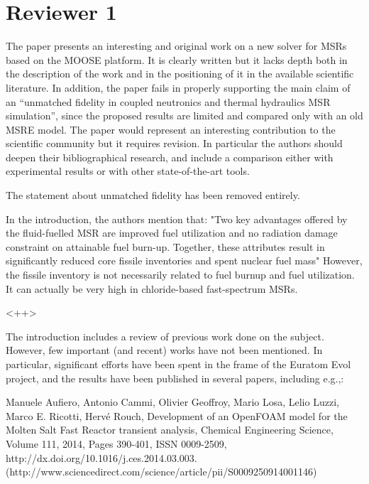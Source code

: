 \documentclass[answers,11pt]{exam}
\begin{document}
\section*{Reviewer 1}
\begin{questions}
\question The paper presents an interesting and original work on a new solver 
        for MSRs based on the MOOSE platform.  It is clearly written but it 
        lacks depth both in the description of the work and in the positioning 
        of it in the available scientific literature.  In addition, the paper 
        fails in properly supporting the main claim of an ``unmatched fidelity 
        in coupled neutronics and thermal hydraulics MSR simulation'', since 
        the proposed results are limited and compared only with an old MSRE 
        model. The paper would represent an interesting contribution to the 
        scientific community but it requires revision. In  particular the 
        authors should deepen their bibliographical research, and include a 
        comparison either with experimental results or with other 
        state-of-the-art tools.
        \begin{solution}
The statement about unmatched fidelity has been removed entirely.
\end{solution}

\question
 In the introduction, the authors mention that:
"Two key advantages offered by the fluid-fuelled MSR are improved fuel utilization and no radiation damage constraint on attainable fuel burn-up. Together, these attributes result in significantly reduced core fissile inventories and spent nuclear fuel mass"
However, the fissile inventory is not necessarily related to fuel burnup and fuel utilization. It can actually be  very high in chloride-based fast-spectrum MSRs.
\begin{solution}
<++>
\end{solution}

\question 
The introduction includes a review of previous work done on the subject. However, few important (and recent) works have not been mentioned. In particular, significant efforts have been spent in the frame of the Euratom Evol project, and the results have been published in several papers, including e.g.,:

Manuele Aufiero, Antonio Cammi, Olivier Geoffroy, Mario Losa, Lelio Luzzi, Marco E. Ricotti, Hervé Rouch, Development of an OpenFOAM model for the Molten Salt Fast Reactor transient analysis, Chemical Engineering Science, Volume 111, 2014, Pages 390-401, ISSN 0009-2509, http://dx.doi.org/10.1016/j.ces.2014.03.003.
(http://www.sciencedirect.com/science/article/pii/S0009250914001146)


\end{questions}
\end{document}

